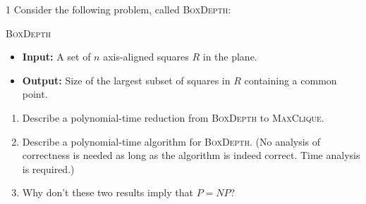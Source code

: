 \documentclass[12pt]{article}
\begin{document}


\begin{problem}{1}
Consider the following problem, called \textsc{BoxDepth}:

\begin{tcolorbox}
    \textsc{BoxDepth}
    \begin{itemize}
        \item \textbf{Input:} A set of $n$ axis-aligned squares $R$ in the plane.
        \item \textbf{Output:} Size of the largest subset of squares in $R$ containing a common point.
    \end{itemize}
\end{tcolorbox}
    
    \begin{enumerate}
        \item Describe a polynomial-time reduction from \textsc{BoxDepth} to \textsc{MaxClique}.
        
        \item Describe a polynomial-time algorithm for \textsc{BoxDepth}. (No analysis of correctness is needed as long as the algorithm is indeed correct. Time analysis is required.)
        
        \item Why don't these two results imply that $P=NP$?
    \end{enumerate}
\end{problem}
\end{document}
